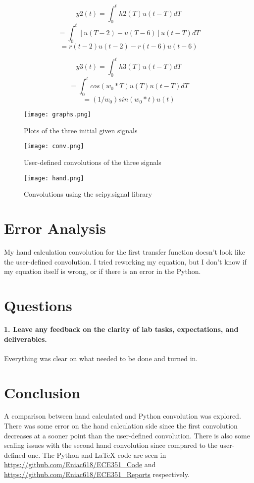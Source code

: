 \documentclass[12pt]{report}
\begin{document}
\begin{equation*}
    y2(t) = \int_0^t h2(T)u(t-T) dT
\end{equation*}
\begin{equation*}
        = \int_0^t [u(T-2) - u(T-6)]u(t-T) dT 
\end{equation*}
\begin{equation*}
    = r(t-2)u(t-2) - r(t-6)u(t-6)
\end{equation*}

\begin{equation*}
    y3(t) = \int_0^t h3(T)u(t-T) dT
\end{equation*}
\begin{equation*}
        = \int_0^t cos(w_0*T)u(T)u(t-T) dT 
\end{equation*}
\begin{equation*}
    = (1/w_0)sin(w_0*t)u(t)
\end{equation*}

\begin{figure}[htp]
    \centering
    \texttt{[image: graphs.png]}
    \caption{Plots of the three initial given signals}
\end{figure}

\begin{figure}[htp]
    \centering
    \texttt{[image: conv.png]}
    \caption{User-defined convolutions of the three signals}
\end{figure}

\begin{figure}[htp]
    \centering
    \texttt{[image: hand.png]}
    \caption{Convolutions using the scipy.signal library}
\end{figure}

\pagebreak
\section{Error Analysis}
My hand calculation convolution for the first transfer function doesn't look like the user-defined convolution. I tried reworking my equation, but I don't know if my equation itself is wrong, or if there is an error in the Python.
\section{Questions}
\textbf{1. Leave any feedback on the clarity of lab tasks, expectations, and deliverables.} \\ \\
Everything was clear on what needed to be done and turned in.

\section{Conclusion}
A comparison between hand calculated and Python convolution was explored. There was some error on the hand calculation side since the first convolution decreases at a sooner point than the user-defined convolution. There is also some scaling issues with the second hand convolution since compared to the user-defined one. The Python and \LaTeX{} code are seen in \url{https://github.com/Eniac618/ECE351_Code} and \url{https://github.com/Eniac618/ECE351_Reports} respectively.
\end{document}
